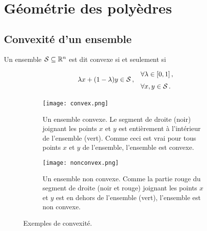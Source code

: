 \section{Géométrie des polyèdres}

\subsection{Convexité d'un ensemble}

	\begin{mydef}
		Un ensemble $\mathcal{S} \subseteq \mathbb{R}^n$ est dit convexe
		si et seulement si
		\[
		\renewcommand{\arraystretch}{1.5}
		\begin{tabular}{c@{\quad}l}
			\multirow{2}{*}{$\lambda x + (1 - \lambda)y \in \mathcal{S}\,,$}
			& $\forall \lambda \in \interval{0}{1}\,,$\\
			& $\forall x,y \in \mathcal{S}$\,.
		\end{tabular}
		\]

		\begin{figure}[H]
		\begin{subfigure}[t]{.45\linewidth}
		\centering
		\texttt{[image: convex.png]}
		\caption{Un ensemble convexe.
		Le segment de droite (noir) joignant les points $x$ et $y$
		est entièrement à l'intérieur de l'ensemble (vert).
		Comme ceci est vrai pour tous points $x$ et $y$ de l'ensemble,
		l'ensemble est convexe.}\label{fig:convex_set}
		\end{subfigure}%
		\hfill
		\begin{subfigure}[t]{.45\linewidth}
		\centering
		\texttt{[image: nonconvex.png]}
		\caption{Un ensemble non convexe.
		Comme la partie rouge du segment de droite (noir et rouge)
		joignant les points $x$ et $y$
		est en dehors de l'ensemble (vert),
		l'ensemble est non convexe.}\label{fig:nonconvex_set}
		\end{subfigure}
		\caption{Exemples de convexité.}\label{fig:convexity}
		\end{figure}
	\end{mydef}

